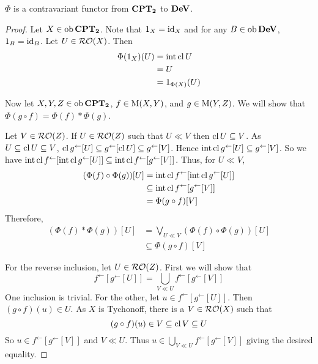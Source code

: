 \begin{theorem}
	\label{phicontra}
	\( \Phi \) is a contravariant functor from \( \bf{CPT}_\mathbf{2} \) to \( \bf{DeV} \).
\end{theorem}
\begin{proof}
	Let \( X \in \operatorname{ob}{\bf{CPT}_\mathbf{2}} \).  Note that \( 1_X = \operatorname{id}_X \) and for any \( B \in \operatorname{ob}{\bf{DeV}} \), \( 1_B = \operatorname{id}_B \).  Let \( U \in \operatorname{\mathcal{RO}}(X) \).  Then
	\begin{align*}
		\Phi(1_X)(U) &= \operatorname{int}\operatorname{cl}{U} \\
		&= U \\
		&= 1_{\Phi(X)} (U)
	\end{align*}
	
	Now let \( X,Y,Z \in \operatorname{ob}{\bf{CPT}_\mathbf{2}} \), \( f \in \operatorname{M}(X,Y) \), and \( g \in \operatorname{M}(Y,Z) \).  We will show that \( \Phi(g \circ f) = \Phi(f) \ast \Phi(g) \).
	
	Let \( V \in \operatorname{\mathcal{RO}}(Z) \).  If \( U \in \operatorname{\mathcal{RO}}(Z) \) such that \( U \ll V \) then \( \operatorname{cl}{U} \subseteq V \).  As \( U \subseteq \operatorname{cl}{U} \subseteq V \), \( \operatorname{cl}{g^\leftarrow[U]} \subseteq g^\leftarrow[\operatorname{cl}{U}] \subseteq g^\leftarrow[V] \).  Hence \( \operatorname{int}\operatorname{cl}{g^\leftarrow[U]} \subseteq g^\leftarrow[V] \).  So we have \( \operatorname{int}\operatorname{cl}{f^\leftarrow[\operatorname{int}\operatorname{cl}{g^\leftarrow[U]}]} \subseteq \operatorname{int}\operatorname{cl}{f^\leftarrow[g^\leftarrow[V]]} \).  Thus, for \( U \ll V \),
	\begin{align*}
		(\Phi(f) \circ \Phi(g))[U] &= \operatorname{int}\operatorname{cl}{f^\leftarrow[\operatorname{int}\operatorname{cl}{g^\leftarrow[U]}]} \\
		&\subseteq \operatorname{int}\operatorname{cl}{f^\leftarrow[g^\leftarrow[V]]}\\
		&= \Phi(g \circ f)[V]
	\end{align*}
	Therefore,
	\begin{align*}
		(\Phi(f) \ast \Phi(g))[U] &= \bigvee_{U \ll V} (\Phi(f) \circ \Phi(g))[U] \\
		&\subseteq \Phi(g \circ f)[V]
	\end{align*}
	
	For the reverse inclusion, let \( U \in \operatorname{\mathcal{RO}}(Z) \).  First we will show that
	\[ f^\leftarrow[g^\leftarrow[U]] = \bigcup_{V \ll U} f^\leftarrow[g^\leftarrow[V]] \]
	One inclusion is trivial.  For the other, let \( u \in f^\leftarrow[g^\leftarrow[U]] \).  Then \( (g \circ f)(u) \in U \).  As \( X \) is Tychonoff, there is a \( V \in \operatorname{\mathcal{RO}}(X) \) such that
	\[ (g \circ f)(u) \in V \subseteq \operatorname{cl}{V} \subseteq U \]
	So \( u \in f^\leftarrow[g^\leftarrow[V]] \) and \( V \ll U \).  Thus \( u \in \bigcup_{V \ll U} f^\leftarrow[g^\leftarrow[V]] \) giving the desired equality.
	

\end{proof}
